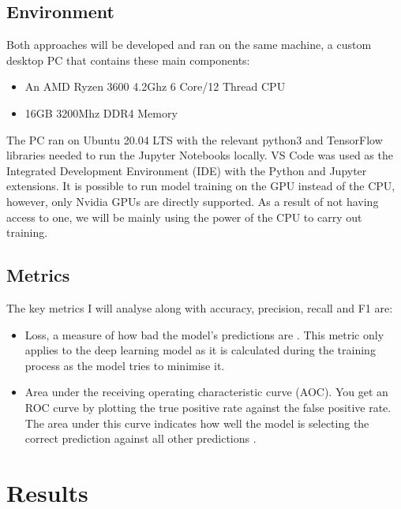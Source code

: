 \documentclass[12pt,a4paper]{report}
\begin{document}
\subsection{Environment}

\label{subsec:env}

Both approaches will be developed and ran on the same machine, a custom desktop PC that contains these main components: 

\begin{itemize}
    \item An AMD Ryzen 3600 4.2Ghz 6 Core/12 Thread CPU
    \item 16GB 3200Mhz DDR4 Memory
\end{itemize}

The PC ran on Ubuntu 20.04 LTS with the relevant python3 and TensorFlow libraries needed to run the Jupyter Notebooks 
locally. VS Code was used as the Integrated Development Environment (IDE) with the Python and Jupyter extensions.  It is
possible to run model training on the GPU instead of the CPU, however, only Nvidia GPUs are directly supported. As a 
result of not having access to one, we will be mainly using the power of the CPU to carry out training.

\subsection{Metrics}

The key metrics I will analyse along with accuracy, precision, recall and F1 are: 

\begin{itemize}
    \item Loss, a measure of how bad the model's predictions are \citep{googletrainloss}. 
    This metric only applies to the deep learning model as it is calculated during the training process as the model 
    tries to minimise it.
    \item Area under the receiving operating characteristic curve (AOC). You get an ROC curve by plotting the true 
    positive rate against the false positive rate. The area under this curve indicates how well the model is selecting 
    the correct prediction against all other predictions \citep{googleroc}.
\end{itemize}

\section{Results}
\end{document}
